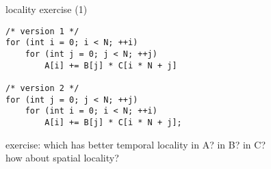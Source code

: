 \begin{frame}[fragile,label=localityExercise1]{locality exercise (1)}
\lstset{language=C,style=small}
\begin{lstlisting}
/* version 1 */
for (int i = 0; i < N; ++i)
    for (int j = 0; j < N; ++j)
        A[i] += B[j] * C[i * N + j]

/* version 2 */
for (int j = 0; j < N; ++j)
    for (int i = 0; i < N; ++i)
        A[i] += B[j] * C[i * N + j];
\end{lstlisting}
exercise: which has better temporal locality in A? in B? in C? \\
how about spatial locality?
\end{frame}

